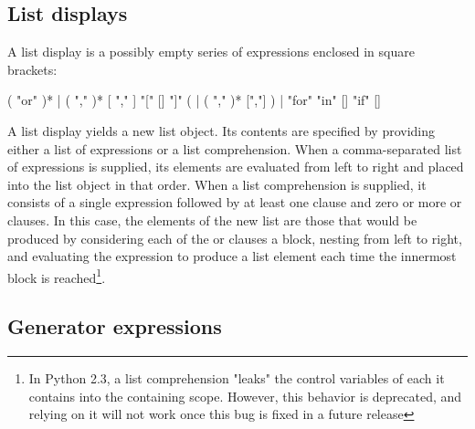 \subsection{List displays\label{lists}}

A list display is a possibly empty series of expressions enclosed in
square brackets:

\begin{productionlist}
             { ( "or"  )*
              | }
             { ( ","  )* [ "," ]}
             {"[" [] "]"}
             { ( 
              | ( ","  )* [","] )}
             { | }
             {"for"  "in" 
              []}
             {"if"  []}
\end{productionlist}

A list display yields a new list object.  Its contents are specified
by providing either a list of expressions or a list comprehension.
When a comma-separated list of expressions is supplied, its elements are
evaluated from left to right and placed into the list object in that
order.  When a list comprehension is supplied, it consists of a
single expression followed by at least one  clause and zero or
more  or  clauses.  In this
case, the elements of the new list are those that would be produced
by considering each of the  or  clauses a block,
nesting from
left to right, and evaluating the expression to produce a list element
each time the innermost block is reached\footnote{In Python 2.3, a
list comprehension "leaks" the control variables of each
 it contains into the containing scope.  However, this
behavior is deprecated, and relying on it will not work once this
bug is fixed in a future release}.


\subsection{Generator expressions\label{genexpr}}


